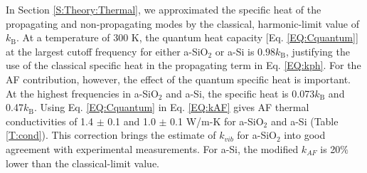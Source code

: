 In Section \ref{S:Theory:Thermal}, we approximated the specific heat 
of the propagating 
and non-propagating modes by the classical, harmonic-limit 
value of $k_{\text{B}}$. At a temperature of $300$ K, the quantum 
heat capacity [Eq. \eqref{EQ:Cquantum}] 
at the largest cutoff frequency for either a-SiO$_2$ or a-Si 
is $0.98 k_{\text{B}}$, justifying the 
use of the classical specific heat in the propagating term 
in Eq. \eqref{EQ:kph}. For the AF contribution, however, the 
effect of the quantum specific heat is important. At the highest 
frequencies in a-SiO$_2$ and a-Si, the specific heat is 
0.073$k_{\text{B}}$ and 0.47$k_{\text{B}}$. 
Using Eq. \eqref{EQ:Cquantum} 
in Eq. \eqref{EQ:kAF} gives AF thermal conductivities of 
1.4 $\pm$ 0.1 and 
1.0 $\pm$ 0.1 W/m-K for a-SiO$_2$ and a-Si (Table \ref{T:cond}). 
This correction brings the estimate of $k_{vib}$ for 
a-SiO$_2$ into good agreement with experimental measurements.
\cite{cahill_lattice_1988,lee_heat_1997,
yamane_measurement_2002,regner_broadband_2013} 
For a-Si, the modified $k_{AF}$ is 20$\%$ lower than the 
classical-limit value. 

